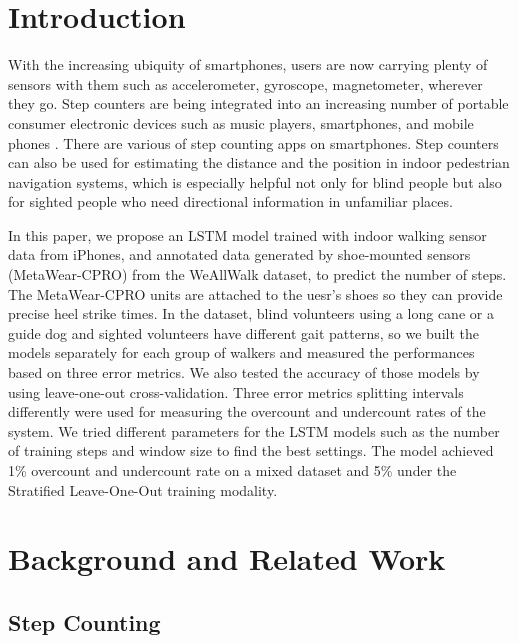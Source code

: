 \documentclass[11pt]{article}
\begin{document}
\section{Introduction}

With the increasing ubiquity of smartphones, users are now carrying plenty of sensors with them such as accelerometer, gyroscope, magnetometer, wherever they go. Step counters are being integrated into an increasing number of portable consumer electronic devices such as music players, smartphones, and mobile phones \citep{wiki:pedometer}. There are various of step counting apps on smartphones. Step counters can also be used for estimating the distance and the position in indoor pedestrian navigation systems, which is especially helpful not only for blind people but also for sighted people who need directional information in unfamiliar places.

In this paper, we propose an LSTM model trained with indoor walking sensor data from iPhones, and annotated data generated by shoe-mounted sensors (MetaWear-CPRO) from the WeAllWalk dataset, to predict the number of steps. The MetaWear-CPRO units are attached to the uesr's shoes so they can provide precise heel strike times. In the dataset, blind volunteers using a long cane or a guide dog and sighted volunteers have different gait patterns, so we built the models separately for each group of walkers and measured the performances based on three error metrics. We also tested the accuracy of those models by using leave-one-out cross-validation. Three error metrics splitting intervals differently were used for measuring the overcount and undercount rates of the system. We tried different parameters for the LSTM models such as the number of training steps and window size to find the best settings. The model achieved 1\% overcount and undercount rate on a mixed dataset and 5\% under the Stratified Leave-One-Out training modality.



\section{Background and Related Work}

\subsection{Step Counting}
\end{document}

